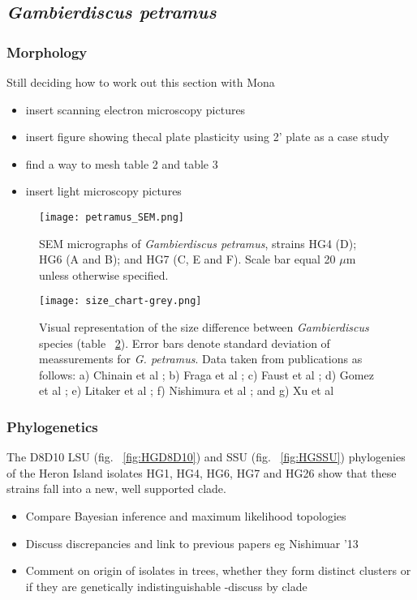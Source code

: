 \documentclass[12pt]{article}
\begin{document}
\subsection{\emph{Gambierdiscus petramus}}

\subsubsection{Morphology}
Still deciding how to work out this section with Mona
\begin{itemize}
\item insert scanning electron microscopy pictures
\item insert figure showing thecal plate plasticity using 2' plate as a case study
\item find a way to mesh table 2 and table 3
\item insert light microscopy pictures
\end{itemize}

\FloatBarrier 
\begin{figure} 
\texttt{[image: petramus\_SEM.png]} 
\caption{SEM micrographs of \emph{Gambierdiscus petramus}, strains HG4 (D); HG6 (A and B); and HG7 (C, E and F). Scale bar equal 20 $\mu$m unless otherwise specified.} 
\label{fig:PetSEM}
\end{figure} 
\FloatBarrier 


\FloatBarrier 
\begin{figure} 
\texttt{[image: size\_chart-grey.png]} 
\caption{Visual representation of the size difference between \emph{Gambierdiscus} species (table ~\ref{fig:SizeGraph}). Error bars denote standard deviation of meassurements for \emph{G. petramus}. Data taken from publications as follows: a) Chinain et al \cite{chinain1999morphology}; b) Fraga et al \cite{fraga2014genus}; c) Faust et al \cite{faust1995observation}; d) Gomez et al \cite{gomez2015fukuyoa}; e) Litaker et al \cite{litaker2009taxonomy}; f) Nishimura et al \cite{nishimura2014morphology}; and g) Xu et al \cite{xu2014distribution}} 
\label{fig:SizeGraph}
\end{figure} 
\FloatBarrier 

\subsubsection{Phylogenetics}

The D8D10 LSU (fig. ~\ref{fig:HGD8D10}) and SSU (fig. ~\ref{fig:HGSSU}) phylogenies of the Heron Island isolates HG1, HG4, HG6, HG7 and HG26 show that these strains fall into a new, well supported clade.\\
\begin{itemize}
\item Compare Bayesian inference and maximum likelihood topologies
\item Discuss discrepancies and link to previous papers eg Nishimuar '13
\item Comment on origin of isolates in trees, whether they form distinct clusters or if they are genetically indistinguishable
-discuss by clade
\end{itemize}
\FloatBarrier 
\end{document}
